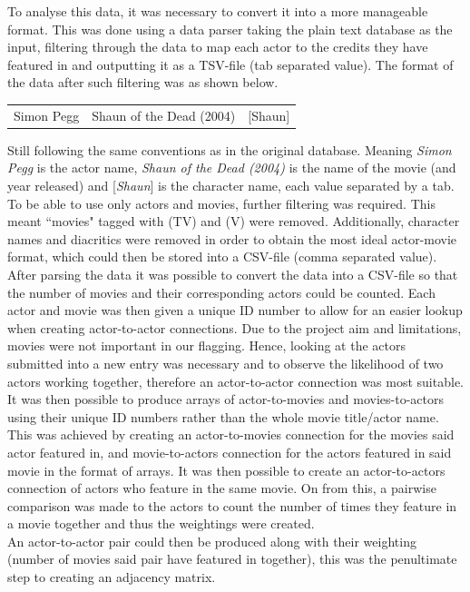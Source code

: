 \documentclass[12pt]{ieeeconf}      %
\begin{document}
\indent To analyse this data, it was necessary to convert it into a more manageable format. This was done using a data parser \cite{parser} taking the plain text database as the input, filtering through the data to map each actor to the credits they have featured in and outputting it as a TSV-file (tab separated value). The format of the data after such filtering was as shown below.

\begin{table}[H]
\centering
\begin{tabular}{lll}
 Simon Pegg		& Shaun of the Dead (2004)	& [Shaun]
\end{tabular}
\end{table}

\indent Still following the same conventions as in the original database. Meaning \textit{Simon Pegg} is the actor name, \textit{Shaun of the Dead (2004)} is the name of the movie (and year released) and [\textit{Shaun}] is the character name, each value separated by a tab.
\\
\indent To be able to use only actors and movies, further filtering was required. This meant ``movies" tagged with (TV) and (V) were removed. Additionally, character names and diacritics were removed in order to obtain the most ideal actor-movie format, which could then be stored into a CSV-file (comma separated value).
\\
\indent After parsing the data it was possible to convert the data into a CSV-file so that the number of movies and their corresponding actors could be counted. Each actor and movie was then given a unique ID number to allow for an easier lookup when creating actor-to-actor connections. Due to the project aim and limitations, movies were not important in our flagging. Hence, looking at the actors submitted into a new entry was necessary and to observe the likelihood of two actors working together, therefore an actor-to-actor connection was most suitable.
\\
\indent It was then possible to produce arrays of actor-to-movies and movies-to-actors using their unique ID numbers rather than the whole movie title/actor name. This was achieved by creating an actor-to-movies connection for the movies said actor featured in, and movie-to-actors connection for the actors featured in said movie in the format of arrays. It was then possible to create an actor-to-actors connection of actors who feature in the same movie. On from this, a pairwise comparison was made to the actors to count the number of times they feature in a movie together and thus the weightings were created.
\\
\indent An actor-to-actor pair could then be produced along with their weighting (number of movies said pair have featured in together), this was the penultimate step to creating an adjacency matrix.
\end{document}
